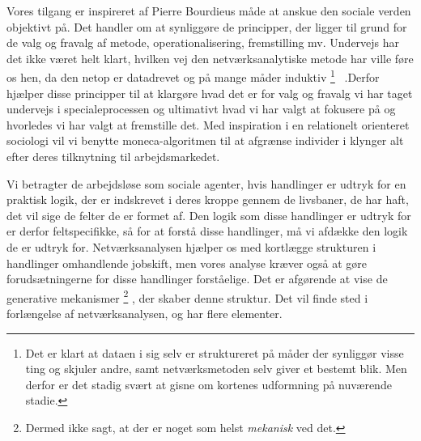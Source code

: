 Vores tilgang er inspireret af Pierre Bourdieus måde at anskue den sociale verden objektivt på. Det handler om at synliggøre de principper, der ligger til grund for de valg og fravalg af metode, operationalisering, fremstilling mv. Undervejs har det ikke været helt klart, hvilken vej den netværksanalytiske metode har ville føre os hen, da den netop er datadrevet og på mange måder induktiv%
%
\footnote{Det er klart at dataen i sig selv er struktureret på måder der synliggør visse ting og skjuler andre, samt netværksmetoden selv giver et bestemt blik. Men derfor er det stadig svært at gisne om kortenes udformning på nuværende stadie.}%
%
\ .Derfor hjælper disse principper til at klargøre hvad det er for valg og fravalg vi har taget undervejs i specialeprocessen og ultimativt hvad vi har valgt at fokusere på og hvorledes vi har valgt at fremstille det. Med inspiration i en relationelt orienteret sociologi vil vi benytte moneca-algoritmen til at afgrænse individer i klynger alt efter deres tilknytning til arbejdsmarkedet. 

Vi betragter de arbejdsløse som sociale agenter, hvis handlinger er udtryk for en praktisk logik, der er indskrevet i deres kroppe gennem de livsbaner, de har haft, det vil sige de felter de er formet af. Den logik som disse handlinger er udtryk for er derfor feltspecifikke, så for at forstå disse handlinger, må vi afdække den logik de er udtryk for.  Netværksanalysen hjælper os med kortlægge strukturen i handlinger omhandlende jobskift, men vores analyse kræver også at gøre forudsætningerne for disse handlinger forståelige. Det er afgørende at vise de generative mekanismer%
\footnote{Dermed ikke sagt, at der er noget som helst \emph{mekanisk} ved det.}%
%
, der skaber denne struktur. Det vil finde sted i forlængelse af netværksanalysen, og har flere elementer.

